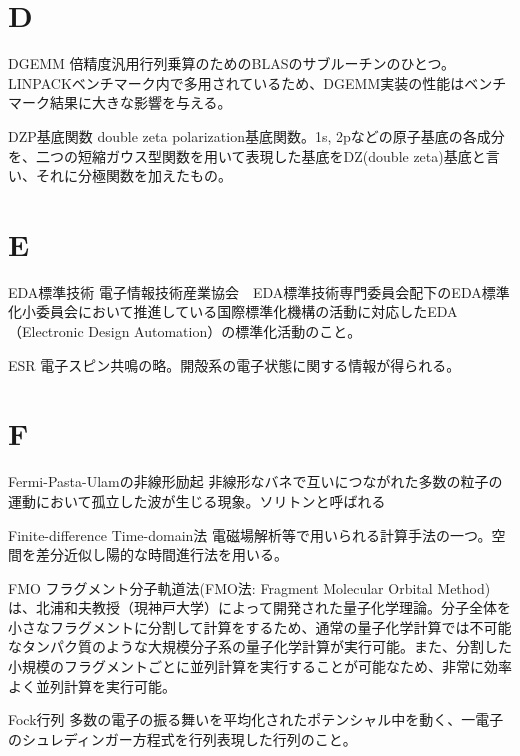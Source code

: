 \begin{用語集}
\section{D}
\item{DGEMM}{}
{倍精度汎用行列乗算のためのBLASのサブルーチンのひとつ。LINPACKベンチマーク内で多用されているため、DGEMM実装の性能はベンチマーク結果に大きな影響を与える。}
\item{DZP基底関数}{}
{double zeta polarization基底関数。1s, 2pなどの原子基底の各成分を、二つの短縮ガウス型関数を用いて表現した基底をDZ(double zeta)基底と言い、それに分極関数を加えたもの。}
\section{E}
\item{EDA標準技術}{}
{電子情報技術産業協会　EDA標準技術専門委員会配下のEDA標準化小委員会において推進している国際標準化機構の活動に対応したEDA（Electronic Design Automation）の標準化活動のこと。}
\item{ESR}{}
{電子スピン共鳴の略。開殻系の電子状態に関する情報が得られる。}
\section{F}
\item{Fermi-Pasta-Ulamの非線形励起}{}
{非線形なバネで互いにつながれた多数の粒子の運動において孤立した波が生じる現象。ソリトンと呼ばれる}
\item{Finite-difference Time-domain法}{}
{電磁場解析等で用いられる計算手法の一つ。空間を差分近似し陽的な時間進行法を用いる。}
\item{FMO}{}
{フラグメント分子軌道法(FMO法: Fragment Molecular Orbital Method)は、北浦和夫教授（現神戸大学）によって開発された量子化学理論。分子全体を小さなフラグメントに分割して計算をするため、通常の量子化学計算では不可能なタンパク質のような大規模分子系の量子化学計算が実行可能。また、分割した小規模のフラグメントごとに並列計算を実行することが可能なため、非常に効率よく並列計算を実行可能。}
\item{Fock行列}{}
{多数の電子の振る舞いを平均化されたポテンシャル中を動く、一電子のシュレディンガー方程式を行列表現した行列のこと。}

\end{用語集}
